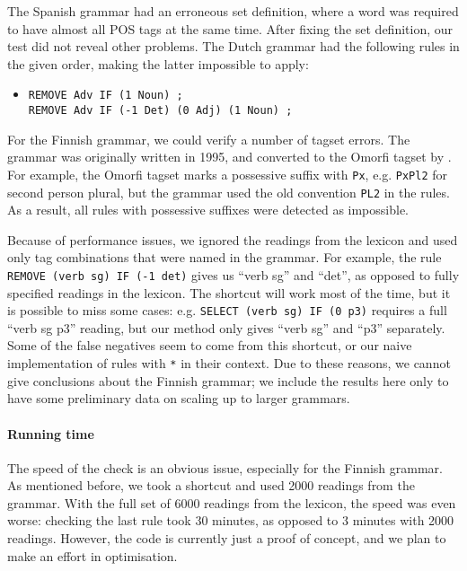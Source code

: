 The Spanish grammar had an erroneous set definition, where a word was
required to have almost all POS tags at the same time. After fixing
the set definition, our test did not reveal other problems.
The Dutch grammar had the following rules in the given order, making the latter impossible to apply:
\begin{itemize}
\item[] 
\begin{verbatim}REMOVE Adv IF (1 Noun) ;
REMOVE Adv IF (-1 Det) (0 Adj) (1 Noun) ;
\end{verbatim}
\end{itemize}

For the Finnish grammar, we could verify a number of tagset errors. 
The grammar was originally written in 1995, and converted to the
Omorfi tagset by \cite{pirinen2015}. For example, the Omorfi tagset
marks a possessive suffix with \texttt{Px}, e.g. \texttt{PxPl2} for second person plural, but the
grammar used the old convention \texttt{PL2} in the rules.
As a result, all rules with possessive suffixes were detected as
impossible.

Because of performance issues, we ignored the readings from the
lexicon and used only tag combinations that were named in the grammar.
For example, the rule \texttt{REMOVE (verb sg) IF (-1 det)}
gives us ``verb sg'' and ``det'', as opposed to fully specified
readings in the lexicon.
The shortcut will work most of the time, but it is possible to
miss some cases: e.g. \texttt{SELECT (verb sg) IF (0 p3)} 
requires a full ``verb sg p3'' reading, but our method only gives
``verb sg'' and ``p3'' separately. 
Some of the false negatives seem to come from this shortcut, or our naive
implementation of rules with \verb!*! in their context.
Due to these reasons, we cannot give conclusions about the Finnish
grammar; we include the results here only to have some preliminary
data on scaling up to larger grammars.

\paragraph{Running time} The speed of the check is an obvious issue,
especially for the Finnish grammar. 
As mentioned before, we took a shortcut and used 2000 readings from
the grammar.
With the full set of 6000 readings from the lexicon, the speed
was even worse: checking the last rule took 30 minutes, as opposed to
3 minutes with 2000 readings. 
However, the code is currently just a proof of concept, and we plan to
make an effort in optimisation.


